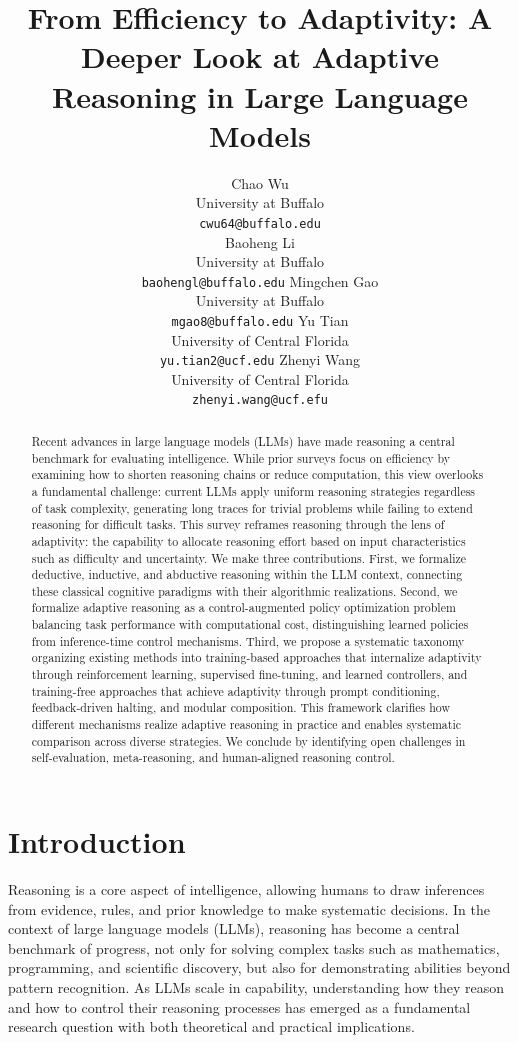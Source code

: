 \documentclass[11pt]{article}
\title{From Efficiency to Adaptivity: A Deeper Look at Adaptive Reasoning in Large Language Models}
\author{
  Chao Wu \\
  University at Buffalo\\
  \texttt{cwu64@buffalo.edu} \\
  \And
  Baoheng Li \\
  University at Buffalo\\
  \texttt{baohengl@buffalo.edu} 
  \AND
  Mingchen Gao \\
  University at Buffalo\\
  \texttt{mgao8@buffalo.edu}
  \And
  Yu Tian \\
  University of Central Florida \\
  \texttt{yu.tian2@ucf.edu}
  \And
  Zhenyi Wang \\
  University of Central Florida \\
  \texttt{zhenyi.wang@ucf.efu} 
}
\begin{document}
\maketitle
\begin{abstract}
Recent advances in large language models (LLMs) have made reasoning a central benchmark for evaluating intelligence. While prior surveys focus on efficiency by examining how to shorten reasoning chains or reduce computation, this view overlooks a fundamental challenge: current LLMs apply uniform reasoning strategies regardless of task complexity, generating long traces for trivial problems while failing to extend reasoning for difficult tasks. This survey reframes reasoning through the lens of {adaptivity}: the capability to allocate reasoning effort based on input characteristics such as difficulty and uncertainty. We make three contributions. First, we formalize deductive, inductive, and abductive reasoning within the LLM context, connecting these classical cognitive paradigms with their algorithmic realizations. Second, we formalize adaptive reasoning as a control-augmented policy optimization problem balancing task performance with computational cost, distinguishing learned policies from inference-time control mechanisms. Third, we propose a systematic taxonomy organizing existing methods into training-based approaches that internalize adaptivity through reinforcement learning, supervised fine-tuning, and learned controllers, and training-free approaches that achieve adaptivity through prompt conditioning, feedback-driven halting, and modular composition. This framework clarifies how different mechanisms realize adaptive reasoning in practice and enables systematic comparison across diverse strategies. We conclude by identifying open challenges in self-evaluation, meta-reasoning, and human-aligned reasoning control.
\end{abstract}

\section{Introduction}
Reasoning is a core aspect of intelligence, allowing humans to draw inferences from evidence, rules, and prior knowledge to make systematic decisions. In the context of large language models (LLMs), reasoning has become a central benchmark of progress, not only for solving complex tasks such as mathematics, programming, and scientific discovery, but also for demonstrating abilities beyond pattern recognition. As LLMs scale in capability, understanding how they reason and how to control their reasoning processes has emerged as a fundamental research question with both theoretical and practical implications.
\end{document}
